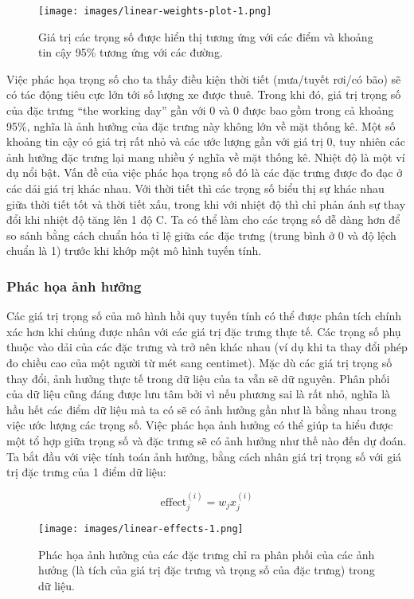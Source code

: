 \begin{figure*}[hb!]
	\centering
	\texttt{[image: images/linear-weights-plot-1.png]}
	\label{fig:4_1_3_1}
	\caption{Giá trị các trọng số được hiển thị tương ứng với các điểm và khoảng tin cậy 95\% tương ứng với các đường.}
\end{figure*}

Việc phác họa trọng số cho ta thấy điều kiện thời tiết (mưa/tuyết rơi/có bão) sẽ có tác động tiêu cực lớn tới số lượng xe được thuê. Trong khi đó, giá trị trọng số của đặc trưng ``the working day'' gần với 0 và 0 được bao gồm trong cả khoảng 95\%, nghĩa là ảnh hưởng của đặc trưng này không lớn về mặt thống kê. Một số khoảng tin cậy có giá trị rất nhỏ và các ước lượng gần với giá trị 0, tuy nhiên các ảnh hưởng đặc trưng lại mang nhiều ý nghĩa về mặt thống kê. Nhiệt độ là một ví dụ nổi bật. Vấn đề của việc phác họa trọng số đó là các đặc trưng được đo đạc ở các dải giá trị khác nhau. Với thời tiết thì các trọng số biểu thị sự khác nhau giữa thời tiết tốt và thời tiết xấu, trong khi với nhiệt độ thì chỉ phản ánh sự thay đổi khi nhiệt độ tăng lên 1 độ C. Ta có thể làm cho các trọng số dễ dàng hơn để so sánh bằng cách chuẩn hóa tỉ lệ giữa các đặc trưng (trung bình ở 0 và độ lệch chuẩn là 1) trước khi khớp một mô hình tuyến tính.

\subsubsection{Phác họa ảnh hưởng}
Các giá trị trọng số của mô hình hồi quy tuyến tính có thể được phân tích chính xác hơn khi chúng được nhân với các giá trị đặc trưng thực tế. Các trọng số phụ thuộc vào dải của các đặc trưng và trở nên khác nhau (ví dụ khi ta thay đổi phép đo chiều cao của một người từ mét sang centimet). Mặc dù các giá trị trọng số thay đổi, ảnh hưởng thực tế trong dữ liệu của ta vẫn sẽ dữ nguyên. Phân phối của dữ liệu cũng đáng được lưu tâm bởi vì nếu phương sai là rất nhỏ, nghĩa là hầu hết các điểm dữ liệu mà ta có sẽ có ảnh hưởng gần như là bằng nhau trong việc ước lượng các trọng số. Việc phác họa ảnh hưởng có thể giúp ta hiểu được một tổ hợp giữa trọng số và đặc trưng sẽ có ảnh hưởng như thế nào đến dự đoán. Ta bắt đầu với việc tính toán ảnh hưởng, bằng cách nhân giá trị trọng số với giá trị đặc trưng của 1 điểm dữ liệu:

$$\text{effect}_{j}^{(i)}=w_{j}x_{j}^{(i)}$$

\begin{figure*}[h!]
	\centering
	\texttt{[image: images/linear-effects-1.png]}
	\label{fig:4_1_3_2}
	\caption{Phác họa ảnh hưởng của các đặc trưng chỉ ra phân phối của các ảnh hưởng (là tích của giá trị đặc trưng và trọng số của đặc trưng) trong dữ liệu.}
\end{figure*}

